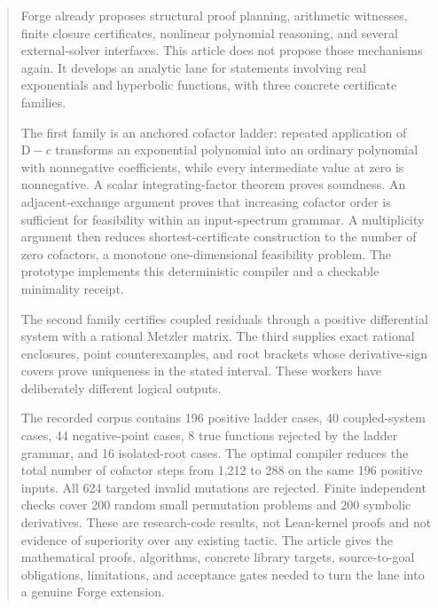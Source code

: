 \documentclass[11pt,a4paper]{article}
\newcommand{\D}{\mathrm D}
\theoremstyle{definition}
\theoremstyle{remark}
\begin{document}
\begin{abstract}
Forge already proposes structural proof planning, arithmetic witnesses, finite closure certificates, nonlinear polynomial reasoning, and several external-solver interfaces. This article does not propose those mechanisms again. It develops an analytic lane for statements involving real exponentials and hyperbolic functions, with three concrete certificate families.

The first family is an anchored cofactor ladder: repeated application of $\D-c$ transforms an exponential polynomial into an ordinary polynomial with nonnegative coefficients, while every intermediate value at zero is nonnegative. A scalar integrating-factor theorem proves soundness. An adjacent-exchange argument proves that increasing cofactor order is sufficient for feasibility within an input-spectrum grammar. A multiplicity argument then reduces shortest-certificate construction to the number of zero cofactors, a monotone one-dimensional feasibility problem. The prototype implements this deterministic compiler and a checkable minimality receipt.

The second family certifies coupled residuals through a positive differential system with a rational Metzler matrix. The third supplies exact rational enclosures, point counterexamples, and root brackets whose derivative-sign covers prove uniqueness in the stated interval. These workers have deliberately different logical outputs.

The recorded corpus contains 196 positive ladder cases, 40 coupled-system cases, 44 negative-point cases, 8 true functions rejected by the ladder grammar, and 16 isolated-root cases. The optimal compiler reduces the total number of cofactor steps from 1,212 to 288 on the same 196 positive inputs. All 624 targeted invalid mutations are rejected. Finite independent checks cover 200 random small permutation problems and 200 symbolic derivatives. These are research-code results, not Lean-kernel proofs and not evidence of superiority over any existing tactic. The article gives the mathematical proofs, algorithms, concrete library targets, source-to-goal obligations, limitations, and acceptance gates needed to turn the lane into a genuine Forge extension.
\end{abstract}
\tableofcontents
\clearpage
{}










\end{document}
